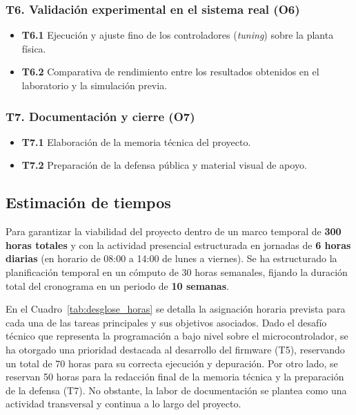 \documentclass[11pt,fleqn]{book} %
\begin{document}
\subsubsection{T6. Validación experimental en el sistema real (O6)}
\begin{itemize}
	\item \textbf{T6.1} Ejecución y ajuste fino de los controladores (\textit{tuning}) sobre la planta física.
	\item \textbf{T6.2} Comparativa de rendimiento entre los resultados obtenidos en el laboratorio y la simulación previa.
\end{itemize}

\subsubsection{T7. Documentación y cierre (O7)}
\begin{itemize}
	\item \textbf{T7.1} Elaboración de la memoria técnica del proyecto.
	\item \textbf{T7.2} Preparación de la defensa pública y material visual de apoyo.
\end{itemize}

\newpage

\subsection{Estimación de tiempos}
\label{sec:estimacion_tiempos}

Para garantizar la viabilidad del proyecto dentro de un marco temporal de \textbf{300 horas totales} y con la actividad presencial estructurada en jornadas de \textbf{6 horas diarias} (en horario de 08:00 a 14:00 de lunes a viernes). Se ha estructurado la planificación temporal en un cómputo de 30 horas semanales, fijando la duración total del cronograma en un periodo de \textbf{10 semanas}.

En el Cuadro~\ref{tab:desglose_horas} se detalla la asignación horaria prevista para cada una de las tareas principales y sus objetivos asociados. Dado el desafío técnico que representa la programación a bajo nivel sobre el microcontrolador, se ha otorgado una prioridad destacada al desarrollo del firmware (T5), reservando un total de 70 horas para su correcta ejecución y depuración. Por otro lado, se reservan 50 horas para la redacción final de la memoria técnica y la preparación de la defensa (T7). No obstante, la labor de documentación se plantea como una actividad transversal y continua a lo largo del proyecto.
\end{document}

